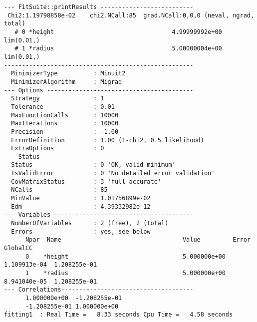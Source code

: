 \begin{lstlisting}[style=eclipse,numbers=none]
--- FitSuite::printResults --------------------------
 Chi2:1.19798858e-02    chi2.NCall:85  grad.NCall:0,0,0 (neval, ngrad, total)
   # 0 *height                                 4.99999992e+00  lim(0.01,)
   # 1 *radius                                 5.00000004e+00  lim(0.01,)
-----------------------------------------------------
  MinimizerType          : Minuit2
  MinimizerAlgorithm     : Migrad
--- Options -----------------------------------------
  Strategy               : 1
  Tolerance              : 0.01
  MaxFunctionCalls       : 10000
  MaxIterations          : 10000
  Precision              : -1.00
  ErrorDefinition        : 1.00 (1-chi2, 0.5 likelihood)
  ExtraOptions           : 0
--- Status ------------------------------------------ 
  Status                 : 0 'OK, valid minimum'
  IsValidError           : 0 'No detailed error validation'
  CovMatrixStatus        : 3 'full accurate'
  NCalls                 : 85
  MinValue               : 1.01756899e-02
  Edm                    : 4.39332982e-12
--- Variables ---------------------------------------
  NumberOfVariables      : 2 (free), 2 (total) 
  Errors                 : yes, see below
      Npar  Name                                  Value         Error         GlobalCC      
      0    *height                                5.000000e+00  1.109913e-04  1.208255e-01  
      1    *radius                                5.000000e+00  8.941040e-05  1.208255e-01  
--- Correlations-------------------------------------
      1.000000e+00  -1.208255e-01 
      -1.208255e-01 1.000000e+00  
fitting1  : Real Time =   8.33 seconds Cpu Time =   4.58 seconds
\end{lstlisting}

